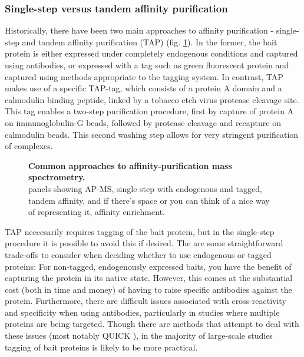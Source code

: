 \documentclass[a4paper,11pt,twoside,openright]{scrbook}
\begin{document}
\subsubsection{Single-step versus tandem affinity purification}
Historically, there have been two main approaches to affinity purification - single-step and tandem affinity purification \cite{Rigaut1999} (TAP) (fig. \ref{c1fig3}). In the former, the bait protein is either expressed under completely endogenous conditions and captured using antibodies, or expressed with a tag such as green fluorescent protein \cite{Hubner2010} and captured using methods appropriate to the tagging system. In contrast, TAP makes use of a specific TAP-tag, which consists of a protein A domain and a calmodulin binding peptide, linked by a tobacco etch virus protease cleavage site. This tag enables a two-step purification procedure, first by capture of protein A on immunoglobulin-G beads, followed by protease cleavage and recapture on calmodulin beads. This second washing step allows for very stringent purification of complexes.

\begin{figure}[h]
    \caption[Common approaches to affinity-purification mass spectrometry]{\sffamily \textbf{Common approaches to affinity-purification mass spectrometry.} \\  panels showing AP-MS, single step with endogenous and tagged, tandem affinity, and if there's space or you can think of a nice way of representing it, affinity enrichment.}
    \label{c1fig3}
\end{figure}

TAP neccesarily requires tagging of the bait protein, but in the single-step procedure it is possible to avoid this if desired. The are some straightforward trade-offs to consider when deciding whether to use endogenous or tagged proteins: For non-tagged, endogenously expressed baits, you have the benefit of capturing the protein in its native state. However, this comes at the substantial cost (both in time and money) of having to raise specific antibodies against the protein. Furthermore, there are difficult issues associated with cross-reactivity and specificity when using antibodies, particularly in studies where multiple proteins are being targeted. Though there are methods that attempt to deal with these issues (most notably QUICK \cite{Selbach2006}), in the majority of large-scale studies tagging of bait proteins is likely to be more practical.
\end{document}
